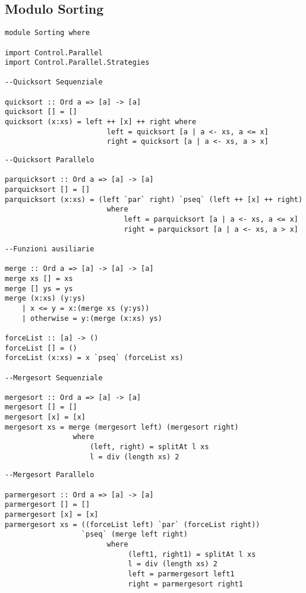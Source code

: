 \subsection{Modulo Sorting}
\begin{verbatim}
module Sorting where

import Control.Parallel
import Control.Parallel.Strategies

--Quicksort Sequenziale

quicksort :: Ord a => [a] -> [a]
quicksort [] = []
quicksort (x:xs) = left ++ [x] ++ right where
                        left = quicksort [a | a <- xs, a <= x]
                        right = quicksort [a | a <- xs, a > x]
\end{verbatim}
\newpage
\begin{verbatim}
--Quicksort Parallelo

parquicksort :: Ord a => [a] -> [a]
parquicksort [] = []
parquicksort (x:xs) = (left `par` right) `pseq` (left ++ [x] ++ right)
                        where
                            left = parquicksort [a | a <- xs, a <= x]
                            right = parquicksort [a | a <- xs, a > x]
                            
--Funzioni ausiliarie

merge :: Ord a => [a] -> [a] -> [a]
merge xs [] = xs
merge [] ys = ys
merge (x:xs) (y:ys)
    | x <= y = x:(merge xs (y:ys))
    | otherwise = y:(merge (x:xs) ys)
    
forceList :: [a] -> ()
forceList [] = ()
forceList (x:xs) = x `pseq` (forceList xs)

--Mergesort Sequenziale

mergesort :: Ord a => [a] -> [a]
mergesort [] = []
mergesort [x] = [x]
mergesort xs = merge (mergesort left) (mergesort right)
                where
                    (left, right) = splitAt l xs
                    l = div (length xs) 2
\end{verbatim}
\newpage
\begin{verbatim}
--Mergesort Parallelo

parmergesort :: Ord a => [a] -> [a]
parmergesort [] = []
parmergesort [x] = [x]
parmergesort xs = ((forceList left) `par` (forceList right))
                  `pseq` (merge left right)
                        where
                             (left1, right1) = splitAt l xs
                             l = div (length xs) 2
                             left = parmergesort left1
                             right = parmergesort right1
\end{verbatim}
